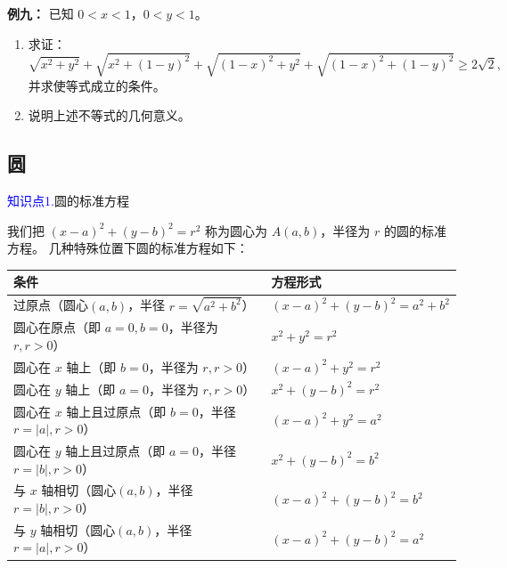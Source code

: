 \documentclass{article}
\begin{document}
\noindent\textbf{例九： }已知 \(0 < x < 1\)，\(0 < y < 1\)。

\begin{enumerate}
    \item 求证：
    \[
    \sqrt{x^2 + y^2} + \sqrt{x^2 + (1 - y)^2} + \sqrt{(1 - x)^2 + y^2} + \sqrt{(1 - x)^2 + (1 - y)^2} \ge 2\sqrt{2},
    \]
    并求使等式成立的条件。

    \item 说明上述不等式的几何意义。
\end{enumerate}
\vspace{10\baselineskip}

\subsection{圆}
\vspace{1\baselineskip}

\textcolor{blue}{知识点1.}圆的标准方程

我们把 \((x - a)^2 + (y - b)^2 = r^2\) 称为圆心为 \(A(a, b)\)，半径为 \(r\) 的圆的标准方程。
几种特殊位置下圆的标准方程如下：

\vspace{1em}

\begin{center}
\begin{tabular}{|m{5.5cm}|m{3.5cm}|}
\hline
\textbf{条件} & \textbf{方程形式} \\
\hline
过原点（圆心\((a,b)\)，半径 \(r = \sqrt{a^2 + b^2}\)） & \((x - a)^2 + (y - b)^2 = a^2 + b^2\) \\
\hline
圆心在原点（即 \(a=0,b=0\)，半径为 \(r,r>0\)） & \(x^2 + y^2 = r^2\) \\
\hline
圆心在 \(x\) 轴上（即 \(b=0\)，半径为 \(r,r>0\)） & \((x - a)^2 + y^2 = r^2\) \\
\hline
圆心在 \(y\) 轴上（即 \(a=0\)，半径为 \(r,r>0\)） & \(x^2 + (y - b)^2 = r^2\) \\
\hline
圆心在 \(x\) 轴上且过原点（即 \(b=0\)，半径 \(r = |a|,r>0\)） & \((x - a)^2 + y^2 = a^2\) \\
\hline
圆心在 \(y\) 轴上且过原点（即 \(a=0\)，半径 \(r = |b|,r>0\)） & \(x^2 + (y - b)^2 = b^2\) \\
\hline
与 \(x\) 轴相切（圆心\((a,b)\)，半径 \(r = |b|,r>0\)） & \((x - a)^2 + (y - b)^2 = b^2\) \\
\hline
与 \(y\) 轴相切（圆心\((a,b)\)，半径 \(r = |a|,r>0\)） & \((x - a)^2 + (y - b)^2 = a^2\) \\
\hline
\end{tabular}
\end{center}
\vspace{1\baselineskip}
\end{document}
